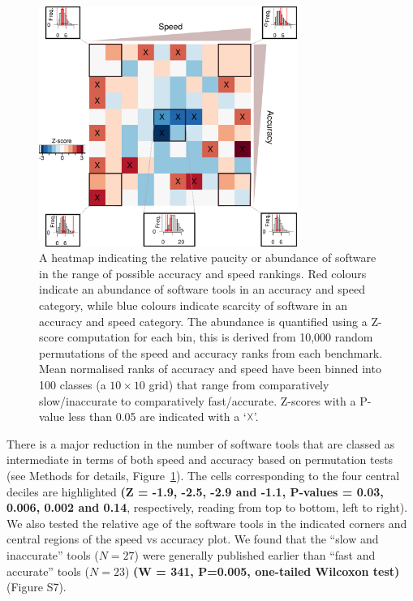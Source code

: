 \documentclass[fleqn,10pt]{SelfArx} %
\begin{document}
\begin{figure}[ht]
\centering
\includegraphics[width=0.75\textwidth]{figure2.pdf}
\caption{A heatmap indicating the relative paucity or abundance of
  software in the range of possible accuracy and speed rankings. Red
  colours indicate an abundance of software tools in an accuracy and
  speed category, while blue colours indicate scarcity of software in
  an accuracy and speed category. The abundance is quantified using a
  Z-score computation for each bin, this is derived from 10,000 random
  permutations of the speed and accuracy ranks from each
  benchmark. Mean normalised ranks of accuracy and speed have been
  binned into 100 classes (a $10\times10$ grid) that range from
  comparatively slow/inaccurate to comparatively
  fast/accurate. Z-scores with a P-value less than 0.05 are indicated
  with a ‘$\vartimes$’.}
\label{fig:speedaccuracy}
\end{figure}

There is a major reduction in the number of software tools that are
classed as intermediate in terms of both speed and accuracy based on
permutation tests (see Methods for details, Figure~\ref{fig:speedaccuracy}). The cells
corresponding to the four central deciles are
highlighted \textbf{{\color{red}(Z = -1.9, -2.5, -2.9 and -1.1, P-values = 0.03, 0.006,
0.002 and 0.14}}, respectively, reading from top to bottom, left to
right). We also tested the relative age of the software tools in
the indicated corners and central regions of the speed vs
accuracy plot. We found that the “slow and inaccurate” tools ($N=27$) were
generally published earlier than ``fast and accurate'' tools ($N=23$) \textbf{{\color{red}(W = 341, P=0.005,
one-tailed Wilcoxon test)}} (Figure S7).
\end{document}
